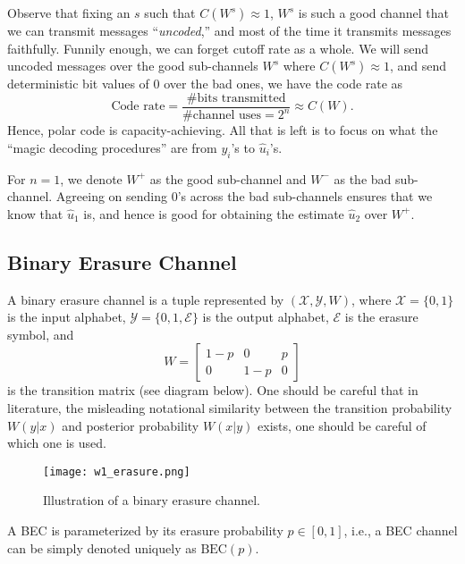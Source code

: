 Observe that fixing an $s$ such that $C(W^s) \approx 1$, $W^s$ is such a good channel that we can transmit messages ``\textit{uncoded},'' and most of the time it transmits messages faithfully. Funnily enough, we can forget cutoff rate as a whole. We will send uncoded messages over the good sub-channels $W^s$ where $C(W^s) \approx 1$, and send deterministic bit values of 0 over the bad ones, we have the code rate as
\begin{equation}
    \text{Code rate} = \frac{\text{\# bits transmitted}}{\text{\# channel uses}=2^n} \approx C(W).
\end{equation}
Hence, polar code is capacity-achieving. All that is left is to focus on what the ``magic decoding procedures'' are from $y_i$'s to $\hat{u}_i$'s.

\begin{remark}\label{rmk:1.2}
    For $n=1$, we denote $W^{+}$ as the good sub-channel and $W^{-}$ as the bad sub-channel. Agreeing on sending 0's across the bad sub-channels ensures that we know that $\hat{u}_1$ is, and hence is good for obtaining the estimate $\hat{u}_2$ over $W^{+}$.
\end{remark}


\subsection{Binary Erasure Channel}
A binary erasure channel is a tuple represented by $(\mathcal{X},\mathcal{Y},W)$, where $\mathcal{X} = \{0,1\}$ is the input alphabet, $\mathcal{Y} = \{0,1,\mathcal{E}\}$ is the output alphabet, $\mathcal{E}$ is the erasure symbol, and
\begin{equation}
    W = \left[\begin{matrix}
        1-p & 0 & p \\
        0 & 1-p & 0
    \end{matrix}\right]
\end{equation}
is the transition matrix (see diagram below). One should be careful that in literature, the misleading notational similarity between the transition probability $W(y\vert x)$ and posterior probability $W(x|y)$ exists, one should be careful of which one is used.
\begin{figure}[H]
    \centering
    \texttt{[image: w1\_erasure.png]}
    \caption{Illustration of a binary erasure channel.}
\end{figure}

A BEC is parameterized by its erasure probability $p\in[0,1]$, i.e., a BEC channel can be simply denoted uniquely as $\mathrm{BEC}(p)$.


